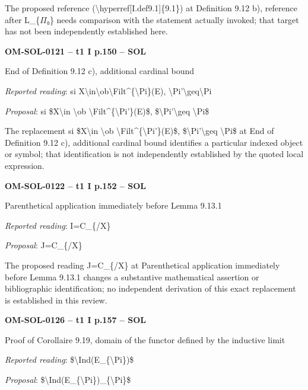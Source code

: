 The proposed reference (\textbackslash{}hyperref[I.def9.1]\{9.1\}) at Definition 9.12 b), reference after L\_\{\ensuremath{\Pi}₀\} needs comparison with the statement actually invoked; that target has not been independently established here.\par
\par\noindent\textbf{OM-SOL-0121 -- t1 I p.150 -- SOL}\par
End of Definition 9.12 c), additional cardinal bound\par
\emph{Reported reading}: si X\textbackslash{}in\textbackslash{}ob\textbackslash{}Filt\textasciicircum{}\{\textbackslash{}Pi\}(E), \textbackslash{}Pi'\textbackslash{}geq\textbackslash{}Pi\par
\emph{Proposal}: si \$X\textbackslash{}in \textbackslash{}ob \textbackslash{}Filt\textasciicircum{}\{\textbackslash{}Pi'\}(E)\$, \$\textbackslash{}Pi'\textbackslash{}geq \textbackslash{}Pi\$\par
The replacement si \$X\textbackslash{}in \textbackslash{}ob \textbackslash{}Filt\textasciicircum{}\{\textbackslash{}Pi'\}(E)\$, \$\textbackslash{}Pi'\textbackslash{}geq \textbackslash{}Pi\$ at End of Definition 9.12 c), additional cardinal bound identifies a particular indexed object or symbol; that identification is not independently established by the quoted local expression.\par
\par\noindent\textbf{OM-SOL-0122 -- t1 I p.152 -- SOL}\par
Parenthetical application immediately before Lemma 9.13.1\par
\emph{Reported reading}: I=\allowbreak C\_\{/X\}\par
\emph{Proposal}: J=\allowbreak C\_\{/X\}\par
The proposed reading J=\allowbreak C\_\{/X\} at Parenthetical application immediately before Lemma 9.13.1 changes a substantive mathematical assertion or bibliographic identification; no independent derivation of this exact replacement is established in this review.\par
\par\noindent\textbf{OM-SOL-0126 -- t1 I p.157 -- SOL}\par
Proof of Corollaire 9.19, domain of the functor defined by the inductive limit\par
\emph{Reported reading}: \$\textbackslash{}Ind(E\_\{\textbackslash{}Pi\})\$\par
\emph{Proposal}: \$\textbackslash{}Ind(E\_\{\textbackslash{}Pi\})\_\{\textbackslash{}Pi\}\$\par
